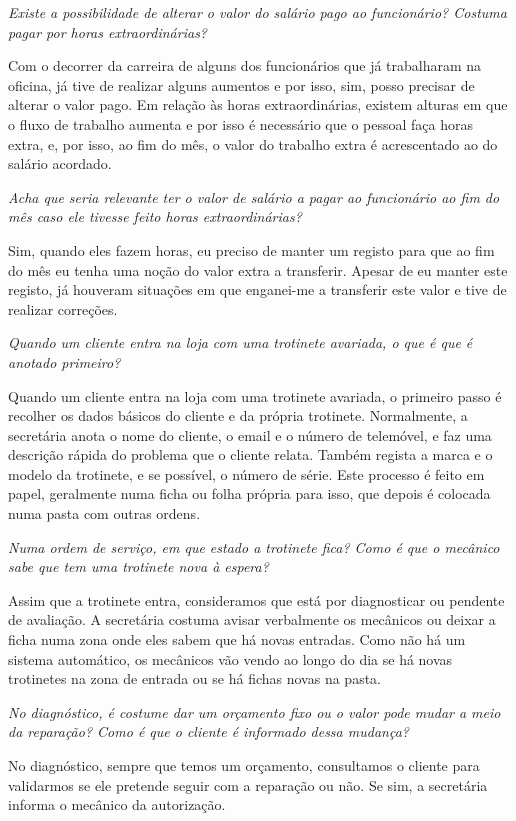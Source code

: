 \documentclass[11pt,a4paper]{article}
\newcommand{\pergunta}[1]{\item[P:] \textit{#1}}
\newcommand{\resposta}[1]{\item[R:] #1}
\begin{document}
\begin{transcription}
		\pergunta{Existe a possibilidade de alterar o valor do salário pago ao funcionário? Costuma pagar por horas extraordinárias?}
		
		\resposta{Com o decorrer da carreira de alguns dos funcionários que já trabalharam na oficina, já tive de realizar alguns aumentos e por isso, sim, posso precisar de alterar o valor pago. Em relação às horas extraordinárias, existem alturas em que o fluxo de trabalho aumenta e por isso é necessário que o pessoal faça horas extra, e, por isso, ao fim do mês, o valor do trabalho extra é acrescentado ao do salário acordado.}
		
		\pergunta{Acha que seria relevante ter o valor de salário a pagar ao funcionário ao fim do mês caso ele tivesse feito horas extraordinárias?}
		
		\resposta{Sim, quando eles fazem horas, eu preciso de manter um registo para que ao fim do mês eu tenha uma noção do valor extra a transferir. Apesar de eu manter este registo, já houveram situações em que enganei-me a transferir este valor e tive de realizar correções.}
		
		\pergunta{Quando um cliente entra na loja com uma trotinete avariada, o que é que é anotado primeiro?}
		
		\resposta{Quando um cliente entra na loja com uma trotinete avariada, o primeiro passo é recolher os dados básicos do cliente e da própria trotinete. Normalmente, a secretária anota o nome do cliente, o email e o número de telemóvel, e faz uma descrição rápida do problema que o cliente relata. Também regista a marca e o modelo da trotinete, e se possível, o número de série. Este processo é feito em papel, geralmente numa ficha ou folha própria para isso, que depois é colocada numa pasta com outras ordens.}
		
		\pergunta{Numa ordem de serviço, em que estado a trotinete fica? Como é que o mecânico sabe que tem uma trotinete nova à espera?}
		\resposta{Assim que a trotinete entra, consideramos que está por diagnosticar ou pendente de avaliação. A secretária costuma avisar verbalmente os mecânicos ou deixar a ficha numa	zona onde eles sabem que há novas entradas. Como não há um sistema automático, os mecânicos vão vendo ao longo do dia se há novas trotinetes na zona de entrada ou se há fichas novas na pasta.}
		
		\pergunta{No diagnóstico, é costume dar um orçamento fixo ou o valor pode mudar a meio da reparação? Como é que o cliente é informado dessa mudança?}
		\resposta{No diagnóstico, sempre que temos um orçamento, consultamos o cliente para validarmos se ele pretende seguir com a reparação ou não. Se sim, a secretária informa o mecânico da autorização.}
		

\end{transcription}
\end{document}

